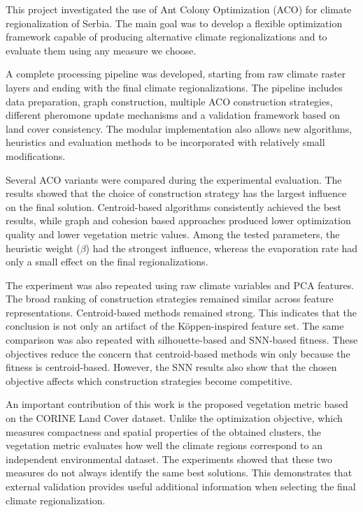 \documentclass[11pt]{article}
\begin{document}
This project investigated the use of Ant Colony Optimization (ACO) for climate regionalization of Serbia. The main goal was to develop a flexible optimization framework capable of producing alternative climate regionalizations and to evaluate them using any measure we choose.

A complete processing pipeline was developed, starting from raw climate raster layers and ending with the final climate regionalizations. The pipeline includes data preparation, graph construction, multiple ACO construction strategies, different pheromone update mechanisms and a validation framework based on land cover consistency. The modular implementation also allows new algorithms, heuristics and evaluation methods to be incorporated with relatively small modifications.

Several ACO variants were compared during the experimental evaluation. The results showed that the choice of construction strategy has the largest influence on the final solution. Centroid-based algorithms consistently achieved the best results, while graph and cohesion based approaches produced lower optimization quality and lower vegetation metric values. Among the tested parameters, the heuristic weight ($\beta$) had the strongest influence, whereas the evaporation rate had only a small effect on the final regionalizations.

The experiment was also repeated using raw climate variables and PCA features. The broad ranking of construction strategies remained similar across feature representations. Centroid-based methods remained strong. This indicates that the conclusion is not only an artifact of the Köppen-inspired feature set. The same comparison was also repeated with silhouette-based and SNN-based fitness. These objectives reduce the concern that centroid-based methods win only because the fitness is centroid-based. However, the SNN results also show that the chosen objective affects which construction strategies become competitive.

An important contribution of this work is the proposed vegetation metric based on the CORINE Land Cover dataset. Unlike the optimization objective, which measures compactness and spatial properties of the obtained clusters, the vegetation metric evaluates how well the climate regions correspond to an independent environmental dataset. The experiments showed that these two measures do not always identify the same best solutions. This demonstrates that external validation provides useful additional information when selecting the final climate regionalization.
\end{document}

